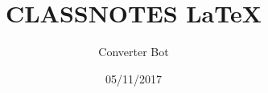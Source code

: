 \documentclass{article}
\begin{document}
\title{CLASSNOTES LaTeX}
\author{Converter Bot}
\date{05/11/2017}

\maketitle




\end{document}
